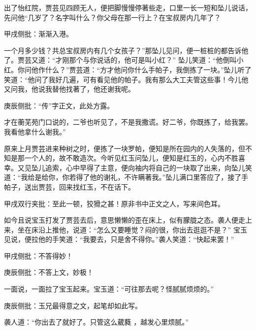 \begin{parag}
    出了怡红院，贾芸见四顾无人，便把脚慢慢停著些走，口里一长一短和坠儿说话，先问他“几岁了？名字叫什么？你父母在那一行上？在宝叔房内几年了？\begin{note}甲戌侧批：渐渐入港。\end{note}一个月多少钱？共总宝叔房内有几个女孩子？”那坠儿见问，便一桩桩的都告诉他了。贾芸又道：“才刚那个与你说话的，他可是叫小红？” 坠儿笑道：“他倒叫小红。你问他作什么？”贾芸道：“方才他问你什么手帕子，我倒拣了一块。”坠儿听了笑道：“他问了我好几遍，可有看见他的帕子。我有那么大工夫管这些事！今儿他又问我，他说我替他找著了，他还谢我呢。\begin{note}庚辰侧批：“传”字正文，此处方露。\end{note}才在蘅芜苑门口说的，二爷也听见了，不是我撒谎。好二爷，你既拣了，给我罢。我看他拿什么谢我。”
\end{parag}


\begin{parag}
    原来上月贾芸进来种树之时，便拣了一块罗帕，便知是所在园内的人失落的，但不知是那一个人的，故不敢造次。今听见红玉问坠儿，便知是红玉的，心内不胜喜幸。又见坠儿追索，心中早得了主意，便向袖内将自己的一块取了出来，向坠儿笑道：“我给是给你，你若得了他的谢礼，不许瞒著我。”坠儿满口里答应了，接了手帕子，送出贾芸，回来找红玉，不在话下。\begin{note}甲戌双行夹批：至此一顿，狡猾之甚！原非书中正文之人，写来间色耳。\end{note}
\end{parag}


\begin{parag}
    如今且说宝玉打发了贾芸去后，意思懒懒的歪在床上，似有朦胧之态。袭人便走上来，坐在床沿上推他，说道：“怎么又要睡觉？闷的很，你出去逛逛不是？” 宝玉见说，便拉他的手笑道：“我要去，只是舍不得你。”袭人笑道：“快起来罢！”\begin{note}甲戌侧批：不答得妙！\end{note}\begin{note}庚辰侧批：不答上文，妙极！\end{note}一面说，一面拉了宝玉起来。宝玉道：“可往那去呢？怪腻腻烦烦的。”\begin{note}庚辰侧批：玉兄最得意之文，起笔却如此写。\end{note}袭人道：“你出去了就好了。只管这么葳蕤 ，越发心里烦腻。”
\end{parag}


